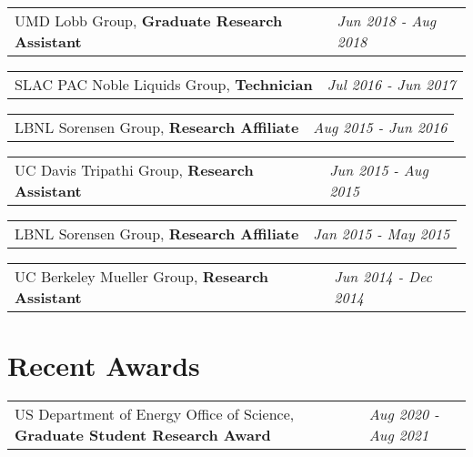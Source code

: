 \documentclass[
  10pt,
  letterpaper,
  DIV=11,
  numbers=noendperiod]{scrartcl}
\begin{document}
\begin{tabularx}{\textwidth}{>{\RaggedRight}p{}  >{\RaggedLeft}X} UMD Lobb Group, \textbf{Graduate Research Assistant} & \textcolor{mygray}{\textit{Jun 2018 - Aug 2018}}  \end{tabularx}

\begin{tabularx}{\textwidth}{>{\RaggedRight}p{}  >{\RaggedLeft}X} SLAC PAC Noble Liquids Group, \textbf{Technician} & \textcolor{mygray}{\textit{Jul 2016 - Jun 2017}}  \end{tabularx}

\begin{tabularx}{\textwidth}{>{\RaggedRight}p{}  >{\RaggedLeft}X} LBNL Sorensen Group, \textbf{Research Affiliate} & \textcolor{mygray}{\textit{Aug 2015 - Jun 2016}}  \end{tabularx}

\begin{tabularx}{\textwidth}{>{\RaggedRight}p{}  >{\RaggedLeft}X} UC Davis Tripathi Group, \textbf{Research Assistant} & \textcolor{mygray}{\textit{Jun 2015 - Aug 2015}}  \end{tabularx}

\begin{tabularx}{\textwidth}{>{\RaggedRight}p{}  >{\RaggedLeft}X} LBNL Sorensen Group, \textbf{Research Affiliate} & \textcolor{mygray}{\textit{Jan 2015 - May 2015}}  \end{tabularx}

\begin{tabularx}{\textwidth}{>{\RaggedRight}p{}  >{\RaggedLeft}X} UC Berkeley Mueller Group, \textbf{Research Assistant} & \textcolor{mygray}{\textit{Jun 2014 - Dec 2014}}  \end{tabularx}

\hypertarget{fa-trophy-recent-awards}{%
\section{\texorpdfstring{ Recent
Awards}{ Recent Awards}}\label{fa-trophy-recent-awards}}

\begin{tabularx}{\textwidth}{>{\RaggedRight}p{}  >{\RaggedLeft}X} US Department of Energy Office of Science, \textbf{Graduate Student Research Award} & \textcolor{mygray}{\textit{Aug 2020 - Aug 2021}}  \end{tabularx}
\end{document}
